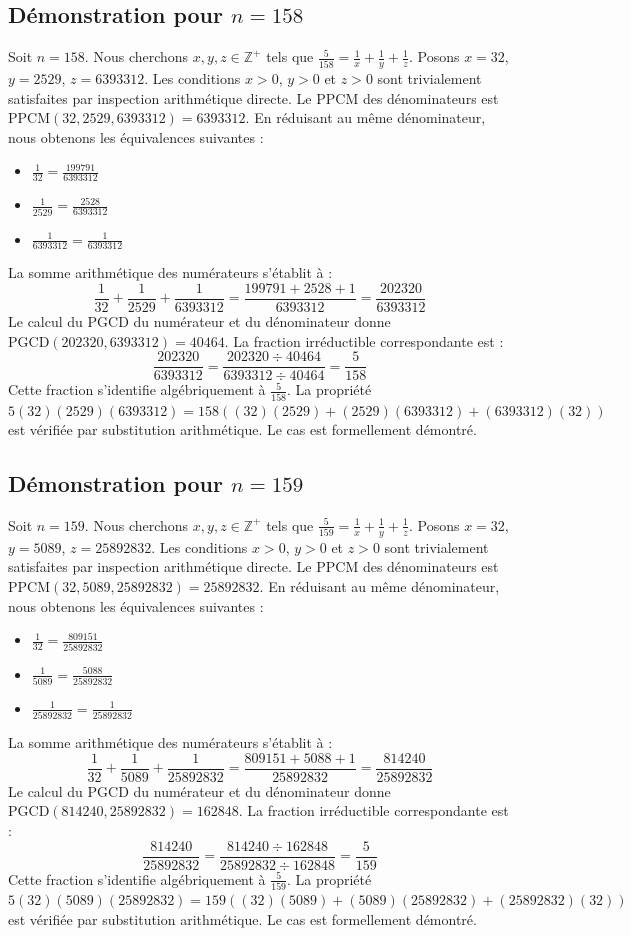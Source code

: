 \documentclass[12pt,a4paper]{article}
\begin{document}
\subsection{Démonstration pour $n = 158$}
Soit $n = 158$. Nous cherchons $x, y, z \in \mathbb{Z}^{+}$ tels que $\frac{5}{158} = \frac{1}{x} + \frac{1}{y} + \frac{1}{z}$.
Posons $x = 32$, $y = 2529$, $z = 6393312$.
Les conditions $x > 0$, $y > 0$ et $z > 0$ sont trivialement satisfaites par inspection arithmétique directe.
Le PPCM des dénominateurs est $\text{PPCM}(32, 2529, 6393312) = 6393312$.
En réduisant au même dénominateur, nous obtenons les équivalences suivantes :
\begin{itemize}
    \item $\frac{1}{32} = \frac{199791}{6393312}$
    \item $\frac{1}{2529} = \frac{2528}{6393312}$
    \item $\frac{1}{6393312} = \frac{1}{6393312}$
\end{itemize}
La somme arithmétique des numérateurs s'établit à :
$$ \frac{1}{32} + \frac{1}{2529} + \frac{1}{6393312} = \frac{199791 + 2528 + 1}{6393312} = \frac{202320}{6393312} $$
Le calcul du PGCD du numérateur et du dénominateur donne $\text{PGCD}(202320, 6393312) = 40464$.
La fraction irréductible correspondante est :
$$ \frac{202320}{6393312} = \frac{202320 \div 40464}{6393312 \div 40464} = \frac{5}{158} $$
Cette fraction s'identifie algébriquement à $\frac{5}{158}$.
La propriété $5(32)(2529)(6393312) = 158((32)(2529) + (2529)(6393312) + (6393312)(32))$ est vérifiée par substitution arithmétique.
Le cas est formellement démontré.

\subsection{Démonstration pour $n = 159$}
Soit $n = 159$. Nous cherchons $x, y, z \in \mathbb{Z}^{+}$ tels que $\frac{5}{159} = \frac{1}{x} + \frac{1}{y} + \frac{1}{z}$.
Posons $x = 32$, $y = 5089$, $z = 25892832$.
Les conditions $x > 0$, $y > 0$ et $z > 0$ sont trivialement satisfaites par inspection arithmétique directe.
Le PPCM des dénominateurs est $\text{PPCM}(32, 5089, 25892832) = 25892832$.
En réduisant au même dénominateur, nous obtenons les équivalences suivantes :
\begin{itemize}
    \item $\frac{1}{32} = \frac{809151}{25892832}$
    \item $\frac{1}{5089} = \frac{5088}{25892832}$
    \item $\frac{1}{25892832} = \frac{1}{25892832}$
\end{itemize}
La somme arithmétique des numérateurs s'établit à :
$$ \frac{1}{32} + \frac{1}{5089} + \frac{1}{25892832} = \frac{809151 + 5088 + 1}{25892832} = \frac{814240}{25892832} $$
Le calcul du PGCD du numérateur et du dénominateur donne $\text{PGCD}(814240, 25892832) = 162848$.
La fraction irréductible correspondante est :
$$ \frac{814240}{25892832} = \frac{814240 \div 162848}{25892832 \div 162848} = \frac{5}{159} $$
Cette fraction s'identifie algébriquement à $\frac{5}{159}$.
La propriété $5(32)(5089)(25892832) = 159((32)(5089) + (5089)(25892832) + (25892832)(32))$ est vérifiée par substitution arithmétique.
Le cas est formellement démontré.
\end{document}
